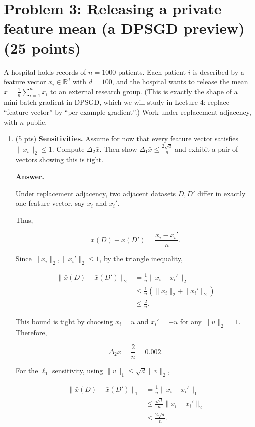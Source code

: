 \documentclass[11pt]{article}
\newcommand{\R}{\mathbb{R}}
\newenvironment{answer}{\par\medskip\noindent\textbf{Answer.}\ }{\par\bigskip}
\newcommand{\problem}[2]{\section*{#1 \hfill\normalsize(#2)}}
\begin{document}
\problem{Problem 3: Releasing a private feature mean (a DPSGD preview)}{25 points}

A hospital holds records of $n=1000$ patients. Each patient $i$ is described
by a feature vector $x_i\in\R^d$ with $d=100$, and the hospital wants to
release the mean $\bar{x}=\frac{1}{n}\sum_{i=1}^n x_i$ to an external research
group. (This is exactly the shape of a mini-batch gradient in DPSGD, which we
will study in Lecture 4: replace ``feature vector'' by ``per-example
gradient''.) Work under replacement adjacency, with $n$ public.

\begin{enumerate}

\item (5 pts) \textbf{Sensitivities.} Assume for now that every feature vector
satisfies $\|x_i\|_2\le1$. Compute $\Delta_2\bar{x}$. Then show
$\Delta_1\bar{x}\le\frac{2\sqrt{d}}{n}$ and exhibit a pair of vectors showing
this is tight.

\begin{answer}

Under replacement adjacency, two adjacent datasets
$D,D'$ differ in exactly one feature vector,
say $x_i$ and $x_i'$.

Thus,

\[
\bar{x}(D)-\bar{x}(D')
=\frac{x_i-x_i'}{n}.
\]

Since $\|x_i\|_2,\|x_i'\|_2\le1$,
by the triangle inequality,

\[
\begin{aligned}
\|\bar{x}(D)-\bar{x}(D')\|_2
&=\frac{1}{n}\|x_i-x_i'\|_2\\
&\le\frac{1}{n}
(\|x_i\|_2+\|x_i'\|_2)\\
&\le\frac{2}{n}.
\end{aligned}
\]

This bound is tight by choosing
$x_i=u$ and $x_i'=-u$ for any
$\|u\|_2=1$. Therefore,

\[
\boxed{\Delta_2\bar{x}=\frac{2}{n}=0.002}.
\]

For the $\ell_1$ sensitivity, using
$\|v\|_1\le\sqrt{d}\|v\|_2$,

\[
\begin{aligned}
\|\bar{x}(D)-\bar{x}(D')\|_1
&=\frac{1}{n}\|x_i-x_i'\|_1\\
&\le\frac{\sqrt d}{n}\|x_i-x_i'\|_2\\
&\le\frac{2\sqrt d}{n}.
\end{aligned}
\]


\end{answer}
\end{enumerate}
\end{document}
